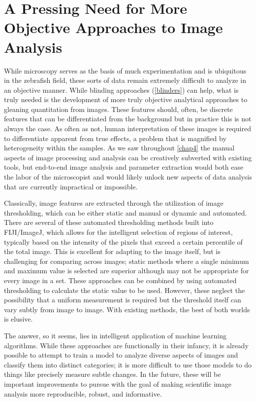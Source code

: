 \section{A Pressing Need for More Objective Approaches to Image Analysis}\label{newimaging}

While microscopy serves as the basis of much experimentation and is ubiquitous in the zebrafish field, these sorts of data remain extremely difficult to analyze in an objective manner. While blinding approaches (\autoref{blinders}) can help, what is truly needed is the development of more truly objective analytical approaches to gleaning quantitation from images. These features should, often, be discrete features that can be differentiated from the background but in practice this is not always the case. As often as not, human interpretation of these images is required to differentiate apparent from true effects, a problem that is magnified by heterogeneity within the samples. As we saw throughout \autoref{chap4} the manual aspects of image processing and analysis can be creatively subverted with existing tools, but end\hyp{}to\hyp{}end image analysis and parameter extraction would both ease the labor of the microscopist and would likely unlock new aspects of data analysis that are currently impractical or impossible.

Classically, image features are extracted through the utilization of image thresholding, which can be either static and manual or dynamic and automated. There are several of these automated thresholding methods built into FIJI/ImageJ, which allows for the intelligent selection of regions of interest, typically based on the intensity of the pixels that exceed a certain percentile of the total image. This is excellent for adapting to the image itself, but is challenging for comparing across images; static methods where a single minimum and maximum value is selected are superior although may not be appropriate for every image in a set. These approaches can be combined by using automated thresholding to calculate the static value to be used. However, these neglect the possibility that a uniform measurement is required but the threshold itself can vary subtly from image to image. With existing methods, the best of both worlds is elusive.

The answer, so it seems, lies in intelligent application of machine learning algorithms. While these approaches are functionally in their infancy, it is already possible to attempt to train a model to analyze diverse aspects of images and classify them into distinct categories; it is more difficult to use those models to do things like precisely measure subtle changes. In the future, these will be important improvements to pursue with the goal of making scientific image analysis more reproducible, robust, and informative.

